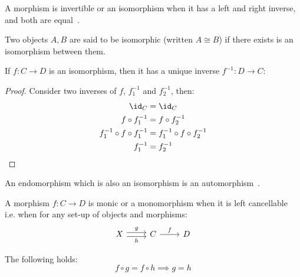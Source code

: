 \begin{definition}[Isomorphism]
  A morphism is invertible or an isomorphism when it has a left and right
  inverse, and both are equal~\parencite[p.~19]{lane:working_mathematician}.
\end{definition}

\begin{remark}
  Two objects $A, B$ are said to be isomorphic (written $A\cong B$) if there
  exists is an isomorphism between them.
\end{remark}

\begin{theorem}
  If $f: C\to D$ is an isomorphism, then it has a unique inverse $f^{-1}:D\to
  C$:
  \begin{proof}
    Consider two inverses of $f$, $f^{-1}_1$ and $f^{-1}_2$, then:
    \[
      \begin{aligned}
        \id_C &= \id_C\\
        f\circ f^{-1}_1 &= f\circ f^{-1}_2\\
        f^{-1}_1 \circ f \circ f^{-1}_1 &= f^{-1}_1 \circ f \circ f^{-1}_2\\
        f^{-1}_1 &= f^{-1}_2
      \end{aligned}
    \]
  \end{proof}
\end{theorem}

\begin{definition}[Automorphism]
  An endomorphism which is also an isomorphism is an
  automorphism~\parencite[p.~7]{riehl:category_theory_in_context}.
\end{definition}

\begin{definition}[Monomorphisms]
  A morphism $f:C\to D$ is monic or a monomorphism when it is left
  cancellable~\parencite[p.~19]{lane:working_mathematician} i.e. when for any
  set-up of objects and morphisms:
  \[\begin{tikzcd}[ampersand replacement=\&]
    X \& C \& D
    \arrow["f", from=1-2, to=1-3]
    \arrow["g", shift left=1, from=1-1, to=1-2]
    \arrow["h"', shift right=1, from=1-1, to=1-2]
  \end{tikzcd}\]

  The following holds:
  \[f \circ g = f \circ h \implies g = h\]
\end{definition}

